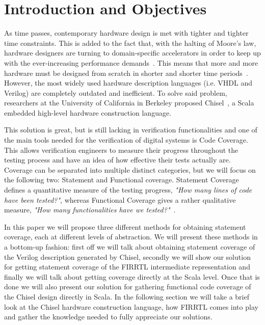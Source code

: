 \documentclass[conference]{IEEEtran}
\begin{document}
\section{Introduction and Objectives}
\label{sec:objectives}
As time passes, contemporary hardware design is met with tighter and tighter time constraints. This is added to the fact that, with the halting of Moore's law, hardware designers are turning to domain-specific accelerators in order to keep up with the ever-increasing performance demands~\cite{henn-patt:turing:2019}. This means that more and more hardware must be designed from scratch in shorter and shorter time periods~\cite{domain-hw-acc:2020}. However, the most widely used hardware description languages (i.e. VHDL and Verilog) are completely outdated and inefficient. To solve said problem, researchers at the University of California in Berkeley proposed Chisel~\cite{chisel:dac2012}, a Scala embedded high-level hardware construction language.

This solution is great, but is still lacking in verification functionalities and one of the main tools needed for the verification of digital systems is Code Coverage. This allows verification engineers to measure their progress throughout the testing process and have an idea of how effective their tests actually are. Coverage can be separated into multiple distinct categories, but we will focus on the following two: Statement and Functional coverage. Statement Coverage defines a quantitative measure of the testing progress, \textit{"How many lines of code have been tested?"}, whereas Functional Coverage gives a rather qualitative measure, \textit{"How many functionalities have we tested?"}~\cite{spear2008systemverilog}.

In this paper we will propose three different methods for obtaining statement coverage, each at different levels of abstraction. We will present these methods in a bottom-up fashion: first off we will talk about obtaining statement coverage of the Verilog description generated by Chisel, secondly we will show our solution for getting statement coverage of the FIRRTL intermediate representation and finally we will talk about getting coverage directly at the Scala level. Once that is done we will also present our solution for gathering functional code coverage of the Chisel design directly in Scala. In the following section we will take a brief look at the Chisel hardware construction language, how FIRRTL comes into play and gather the knowledge needed to fully appreciate our solutions.
\end{document}
